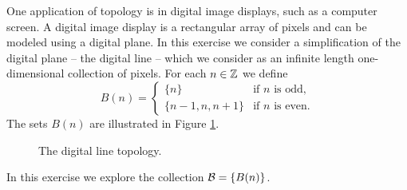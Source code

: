 \begin{comment}

\ExerciseSolution  By definition, we have $\emptyset$ and $X$ in $\tau_{\overline{p}}$. Let $\{A_{\alpha}\}$ be a collection of sets in $\tau_{\overline{p}}$ for $\alpha$ in some indexing set $I$. If $A_{\beta} = X$ for some $\beta \in I$, then $\bigcup_{\alpha \in I} A_{\alpha} = X$ is in $\tau_{\overline{p}}$. Suppose now that $A_{\alpha} \neq X$ for every $\alpha \in I$. Then $p \notin A_{\alpha}$ for every $\alpha$ in $I$, and it follows that $p \notin \bigcup_{\alpha \in I} A_{\alpha}$, and $\bigcup_{\alpha \in I} A_{\alpha} \in \tau_{\overline{p}}$. Thus arbitrary unions of elements in $\tau_{\overline{p}}$ are in $\tau_{\overline{p}}$.

Now suppose that $I$ is a finite set. If $A_{\alpha} = X$ for every $\alpha \in I$, then $\bigcap_{\alpha \in I} A_{\alpha} = X$ is in $\tau_{\overline{p}}$. Now suppose that $A_{\beta} \neq X$ for some $\beta \in I$. Since $p \notin A_{\beta}$, we have that $p \notin \bigcap_{\alpha \in I} A_{\alpha}$. So $\bigcap_{\alpha \in I} A_{\alpha} \in \tau_{\overline{p}}$ and $\tau_{\overline{p}}$ is closed under finite intersections. We conclude that $\tau_{\overline{p}}$ is a topology on $X$.

\end{comment}

\item \label{ex:digital_line_topology} One application of topology is in digital image displays, such as a computer screen. A digital image display is a rectangular array of pixels and can be modeled using a digital plane. In this exercise we consider a simplification of the digital plane -- the digital line -- which we consider as an infinite length one-dimensional collection of pixels. For each $n \in \mathbb{Z}$ we define  
\[B(n) = \begin{cases} \{n\}	&\text{if $n$ is odd}, \\ \{n-1,n,n+1\}	&\text{if $n$ is even}. \end{cases}\]
The sets $B(n)$ are illustrated in Figure \ref{F:Digital_line}.
\begin{figure}[ht]
\begin{center}
\caption{The digital line topology.}
\label{F:Digital_line}
\end{center}
\end{figure}

In this exercise we explore the collection $\mathcal{B} = \{B(n)\}$. 

